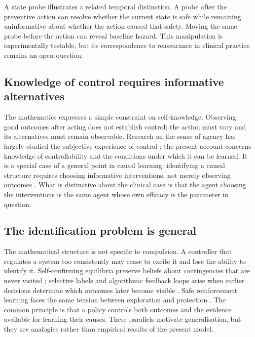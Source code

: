 \documentclass[11pt]{article}
\begin{document}
A state probe illustrates a related temporal distinction. A probe after the
preventive action can resolve whether the current state is safe while remaining
uninformative about whether the action caused that safety. Moving the same probe
before the action can reveal baseline hazard. This manipulation is experimentally
testable, but its correspondence to reassurance in clinical practice remains an
open question.

\subsection{Knowledge of control requires informative alternatives}

The mathematics expresses a simple constraint on self-knowledge. Observing good
outcomes after acting does not establish control; the action must vary and its
alternatives must remain observable. Research on the sense of agency has largely
studied the subjective experience of control
\citep{haggard2017sense,moore2016agency,gentsch2012agency};
the present account concerns knowledge of controllability and the conditions
under which it can be learned. It is a special case of a general point in causal learning:
identifying a causal structure requires choosing informative interventions, not
merely observing outcomes \citep{he2008active}. What is distinctive about the
clinical case is that the agent choosing the interventions is the same agent whose
own efficacy is the parameter in question.

\subsection{The identification problem is general}

The mathematical structure is not specific to compulsion. A controller that
regulates a system too consistently may cease to excite it and lose the ability
to identify it. Self-confirming
equilibria preserve beliefs about contingencies that are never visited
\citep{fudenberg1993selfconfirming}; selective labels and algorithmic feedback
loops arise when earlier decisions determine which outcomes later become visible
\citep{lakkaraju2017selective,chaney2018algorithmic}. Safe reinforcement learning
faces the same tension between exploration and protection
\citep{moldovan2012safe}. The common principle is that a policy controls both
outcomes and the evidence available for learning their causes. These parallels
motivate generalisation, but they are analogies rather than empirical results of
the present model.
\end{document}
